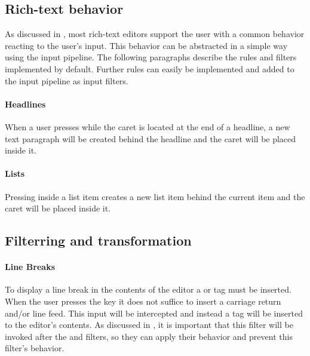 \subsection{Rich-text behavior}

As discussed in , most rich-text editors support the user with a common behavior reacting to the user's input. This behavior can be abstracted in a simple way using the input pipeline. The following paragraphs describe the rules and filters implemented by default. Further rules can easily be implemented and added to the input pipeline as input filters.

\paragraph{Headlines} When a user presses  while the caret is located at the end of a headline, a new text paragraph will be created behind the headline and the caret will be placed inside it.

\paragraph{Lists} Pressing  inside a list item creates a new list item behind the current item and the caret will be placed inside it.

\subsection{Filterring and transformation}

\paragraph{Line Breaks} To display a line break in the contents of the editor a  or  tag must be inserted. When the user presses the  key it does not suffice to insert a carriage return and/or line feed. This input will be intercepted and instead a  tag will be inserted to the editor's contents. As discussed in , it is important that this filter will be invoked after the  and  filters, so they can apply their behavior and prevent this filter's behavior.


